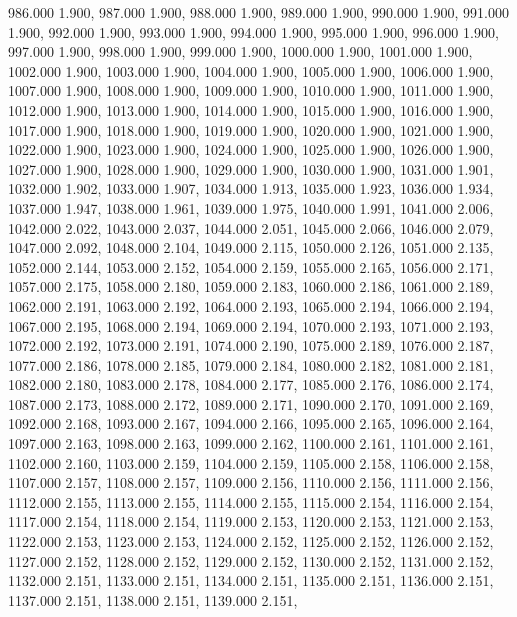 986.000 1.900, 
987.000 1.900, 
988.000 1.900, 
989.000 1.900, 
990.000 1.900, 
991.000 1.900, 
992.000 1.900, 
993.000 1.900, 
994.000 1.900, 
995.000 1.900, 
996.000 1.900, 
997.000 1.900, 
998.000 1.900, 
999.000 1.900, 
1000.000 1.900, 
1001.000 1.900, 
1002.000 1.900, 
1003.000 1.900, 
1004.000 1.900, 
1005.000 1.900, 
1006.000 1.900, 
1007.000 1.900, 
1008.000 1.900, 
1009.000 1.900, 
1010.000 1.900, 
1011.000 1.900, 
1012.000 1.900, 
1013.000 1.900, 
1014.000 1.900, 
1015.000 1.900, 
1016.000 1.900, 
1017.000 1.900, 
1018.000 1.900, 
1019.000 1.900, 
1020.000 1.900, 
1021.000 1.900, 
1022.000 1.900, 
1023.000 1.900, 
1024.000 1.900, 
1025.000 1.900, 
1026.000 1.900, 
1027.000 1.900, 
1028.000 1.900, 
1029.000 1.900, 
1030.000 1.900, 
1031.000 1.901, 
1032.000 1.902, 
1033.000 1.907, 
1034.000 1.913, 
1035.000 1.923, 
1036.000 1.934, 
1037.000 1.947, 
1038.000 1.961, 
1039.000 1.975, 
1040.000 1.991, 
1041.000 2.006, 
1042.000 2.022, 
1043.000 2.037, 
1044.000 2.051, 
1045.000 2.066, 
1046.000 2.079, 
1047.000 2.092, 
1048.000 2.104, 
1049.000 2.115, 
1050.000 2.126, 
1051.000 2.135, 
1052.000 2.144, 
1053.000 2.152, 
1054.000 2.159, 
1055.000 2.165, 
1056.000 2.171, 
1057.000 2.175, 
1058.000 2.180, 
1059.000 2.183, 
1060.000 2.186, 
1061.000 2.189, 
1062.000 2.191, 
1063.000 2.192, 
1064.000 2.193, 
1065.000 2.194, 
1066.000 2.194, 
1067.000 2.195, 
1068.000 2.194, 
1069.000 2.194, 
1070.000 2.193, 
1071.000 2.193, 
1072.000 2.192, 
1073.000 2.191, 
1074.000 2.190, 
1075.000 2.189, 
1076.000 2.187, 
1077.000 2.186, 
1078.000 2.185, 
1079.000 2.184, 
1080.000 2.182, 
1081.000 2.181, 
1082.000 2.180, 
1083.000 2.178, 
1084.000 2.177, 
1085.000 2.176, 
1086.000 2.174, 
1087.000 2.173, 
1088.000 2.172, 
1089.000 2.171, 
1090.000 2.170, 
1091.000 2.169, 
1092.000 2.168, 
1093.000 2.167, 
1094.000 2.166, 
1095.000 2.165, 
1096.000 2.164, 
1097.000 2.163, 
1098.000 2.163, 
1099.000 2.162, 
1100.000 2.161, 
1101.000 2.161, 
1102.000 2.160, 
1103.000 2.159, 
1104.000 2.159, 
1105.000 2.158, 
1106.000 2.158, 
1107.000 2.157, 
1108.000 2.157, 
1109.000 2.156, 
1110.000 2.156, 
1111.000 2.156, 
1112.000 2.155, 
1113.000 2.155, 
1114.000 2.155, 
1115.000 2.154, 
1116.000 2.154, 
1117.000 2.154, 
1118.000 2.154, 
1119.000 2.153, 
1120.000 2.153, 
1121.000 2.153, 
1122.000 2.153, 
1123.000 2.153, 
1124.000 2.152, 
1125.000 2.152, 
1126.000 2.152, 
1127.000 2.152, 
1128.000 2.152, 
1129.000 2.152, 
1130.000 2.152, 
1131.000 2.152, 
1132.000 2.151, 
1133.000 2.151, 
1134.000 2.151, 
1135.000 2.151, 
1136.000 2.151, 
1137.000 2.151, 
1138.000 2.151, 
1139.000 2.151, 
